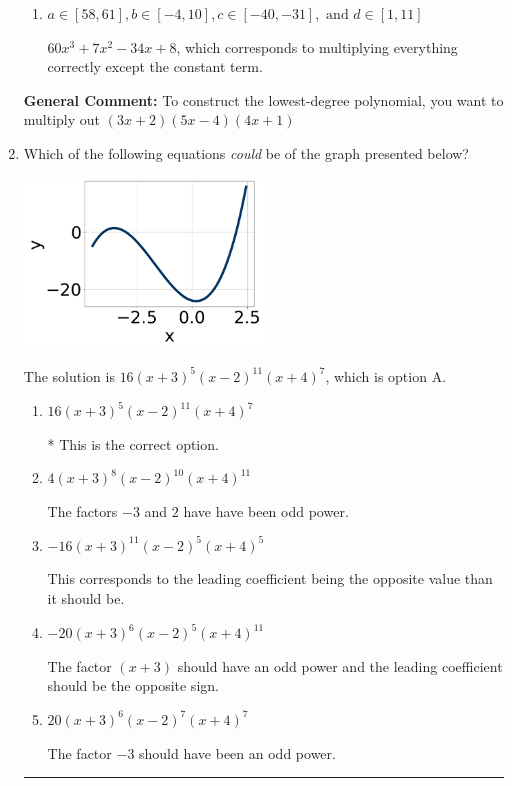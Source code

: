 \documentclass{extbook}[14pt]
\newcommand{\litem}[1]{\item #1

\rule{\textwidth}{0.4pt}}
\begin{document}
\begin{enumerate}
{\begin{enumerate}[label=\Alph*.]
* $60x^{3} +7 x^{2} -34 x -8$, which is the correct option.
\item \( a \in [58, 61], b \in [-4, 10], c \in [-40, -31], \text{ and } d \in [1, 11] \)

$60x^{3} +7 x^{2} -34 x + 8$, which corresponds to multiplying everything correctly except the constant term.
\end{enumerate}

\textbf{General Comment:} To construct the lowest-degree polynomial, you want to multiply out $(3x + 2)(5x -4)(4x + 1)$
}
\litem{
Which of the following equations \textit{could} be of the graph presented below?

\begin{center}
    \includegraphics[width=0.5\textwidth]{../Figures/polyGraphToFunctionCopyA.png}
\end{center}



The solution is \( 16(x + 3)^{5} (x - 2)^{11} (x + 4)^{7} \), which is option A.\begin{enumerate}[label=\Alph*.]
\item \( 16(x + 3)^{5} (x - 2)^{11} (x + 4)^{7} \)

* This is the correct option.
\item \( 4(x + 3)^{8} (x - 2)^{10} (x + 4)^{11} \)

The factors $-3$ and $2$ have have been odd power.
\item \( -16(x + 3)^{11} (x - 2)^{5} (x + 4)^{5} \)

This corresponds to the leading coefficient being the opposite value than it should be.
\item \( -20(x + 3)^{6} (x - 2)^{5} (x + 4)^{11} \)

The factor $(x + 3)$ should have an odd power and the leading coefficient should be the opposite sign.
\item \( 20(x + 3)^{6} (x - 2)^{7} (x + 4)^{7} \)

The factor $-3$ should have been an odd power.
\end{enumerate}

}
\end{enumerate}
\end{document}
